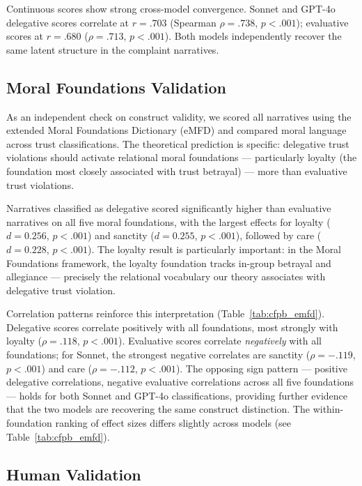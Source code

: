 Continuous scores show strong cross-model convergence. Sonnet and GPT-4o delegative scores correlate at $r = .703$ (Spearman $\rho = .738$, $p < .001$); evaluative scores at $r = .680$ ($\rho = .713$, $p < .001$). Both models independently recover the same latent structure in the complaint narratives.

\subsection{Moral Foundations Validation}

As an independent check on construct validity, we scored all narratives using the extended Moral Foundations Dictionary (eMFD) and compared moral language across trust classifications. The theoretical prediction is specific: delegative trust violations should activate relational moral foundations --- particularly loyalty (the foundation most closely associated with trust betrayal) --- more than evaluative trust violations.

Narratives classified as delegative scored significantly higher than evaluative narratives on all five moral foundations, with the largest effects for loyalty ($d = 0.256$, $p < .001$) and sanctity ($d = 0.255$, $p < .001$), followed by care ($d = 0.228$, $p < .001$). The loyalty result is particularly important: in the Moral Foundations framework, the loyalty foundation tracks in-group betrayal and allegiance --- precisely the relational vocabulary our theory associates with delegative trust violation.



Correlation patterns reinforce this interpretation (Table~\ref{tab:cfpb_emfd}). Delegative scores correlate positively with all foundations, most strongly with loyalty ($\rho = .118$, $p < .001$). Evaluative scores correlate \textit{negatively} with all foundations; for Sonnet, the strongest negative correlates are sanctity ($\rho = -.119$, $p < .001$) and care ($\rho = -.112$, $p < .001$). The opposing sign pattern --- positive delegative correlations, negative evaluative correlations across all five foundations --- holds for both Sonnet and GPT-4o classifications, providing further evidence that the two models are recovering the same construct distinction. The within-foundation ranking of effect sizes differs slightly across models (see Table~\ref{tab:cfpb_emfd}).

\subsection{Human Validation}

